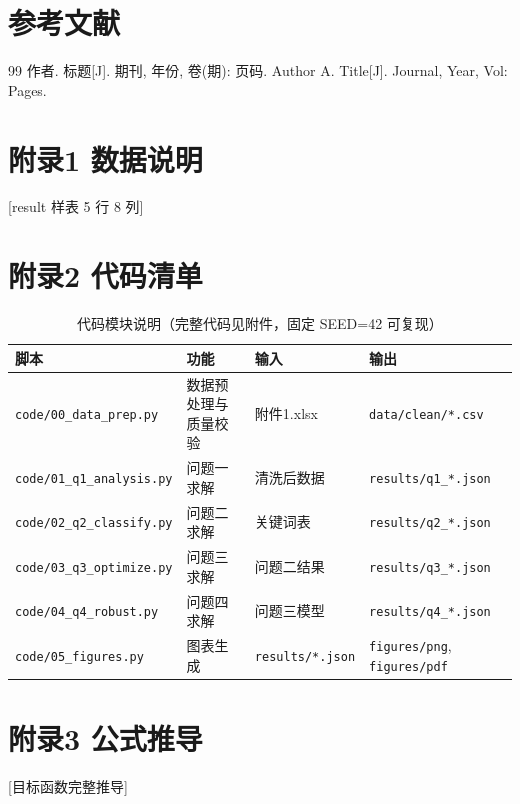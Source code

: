 \documentclass[12pt,a4paper]{ctexart}
\begin{document}
\section{参考文献}
\begin{thebibliography}{99}
 作者. 标题[J]. 期刊, 年份, 卷(期): 页码.
 Author A. Title[J]. Journal, Year, Vol: Pages.
\end{thebibliography}

\appendix
\section{附录1 数据说明}
[result 样表 5 行 8 列]

\section{附录2 代码清单}
\begin{table}[H]
\centering
\caption{代码模块说明（完整代码见附件，固定 SEED=42 可复现）}
\label{tab:code_modules}
\begin{tabular}{llll}
\toprule
脚本 & 功能 & 输入 & 输出 \\
\midrule
\texttt{code/00\_data\_prep.py} & 数据预处理与质量校验 & 附件1.xlsx & \texttt{data/clean/*.csv} \\
\texttt{code/01\_q1\_analysis.py} & 问题一求解 & 清洗后数据 & \texttt{results/q1\_*.json} \\
\texttt{code/02\_q2\_classify.py} & 问题二求解 & 关键词表 & \texttt{results/q2\_*.json} \\
\texttt{code/03\_q3\_optimize.py} & 问题三求解 & 问题二结果 & \texttt{results/q3\_*.json} \\
\texttt{code/04\_q4\_robust.py} & 问题四求解 & 问题三模型 & \texttt{results/q4\_*.json} \\
\texttt{code/05\_figures.py} & 图表生成 & \texttt{results/*.json} & \texttt{figures/png}, \texttt{figures/pdf} \\
\bottomrule
\end{tabular}
\end{table}

% 
% 
% 
% 
% 

\section{附录3 公式推导}
[目标函数完整推导]
\end{document}
